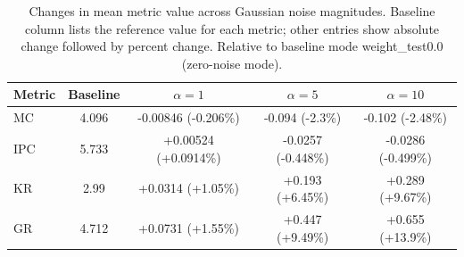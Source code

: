 \begin{table}[t]
\centering
\small
\caption{Changes in mean metric value across Gaussian noise magnitudes. Baseline column lists the reference value for each metric; other entries show absolute change followed by percent change. Relative to baseline mode weight\_test0.0 (zero-noise mode).}
\label{tab:weight-gauss-diff-mean-perf}
\begin{tabular}{lcccc}
\toprule
Metric & Baseline & $\alpha=1$ & $\alpha=5$ & $\alpha=10$ \\
\midrule
MC & 4.096 & -0.00846 (-0.206\%) & -0.094 (-2.3\%) & -0.102 (-2.48\%) \\
IPC & 5.733 & +0.00524 (+0.0914\%) & -0.0257 (-0.448\%) & -0.0286 (-0.499\%) \\
KR & 2.99 & +0.0314 (+1.05\%) & +0.193 (+6.45\%) & +0.289 (+9.67\%) \\
GR & 4.712 & +0.0731 (+1.55\%) & +0.447 (+9.49\%) & +0.655 (+13.9\%) \\
\bottomrule
\end{tabular}
\end{table}
